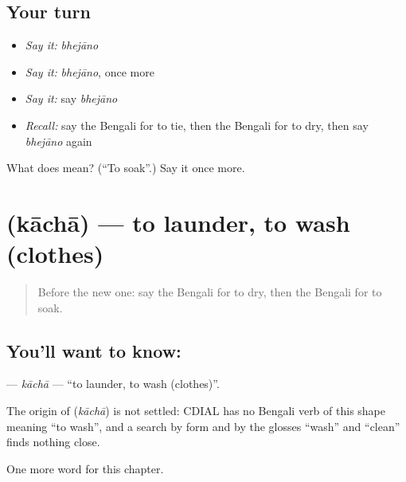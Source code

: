 \subsection*{Your turn}
\begin{itemize}
\raggedright
  \item \emph{Say it:} \emph{bhejāno}
  \item \emph{Say it:} \emph{bhejāno}, once more
  \item \emph{Say it:} say \emph{bhejāno}
  \item \emph{Recall:} say the Bengali for to tie, then the Bengali for to dry, then say \emph{bhejāno} again
\end{itemize}

\begin{tcolorbox}[breakable,colback=teal!4,colframe=teal!35!black,title={Before you move on}]
What does  mean? (\textquotedblleft{}To soak\textquotedblright{}.) Say it once more.
\end{tcolorbox}
\section[\texorpdfstring{\bn{কাচা} (kāchā)}{কাচা (kāchā)}]{ (kāchā) — to launder, to wash (clothes)}

\label{lesson:BN-C152-kacha}



\begin{quote}
Before the new one: say the Bengali for to dry, then the Bengali for to soak.
\end{quote}

\subsection*{You'll want to know: }
\textbf{} — \emph{kāchā} — \textquotedblleft{}to launder, to wash (clothes)\textquotedblright{}.

\begin{cousinweb}
The origin of \textbf{} (\emph{kāchā}) is not settled: CDIAL has no Bengali verb of this shape meaning \textquotedblleft{}to wash\textquotedblright{}, and a search by form and by the glosses \textquotedblleft{}wash\textquotedblright{} and \textquotedblleft{}clean\textquotedblright{} finds nothing close.
\end{cousinweb}

\begin{grammarlens}[title={What you've built}]
One more word for this chapter.
\end{grammarlens}

